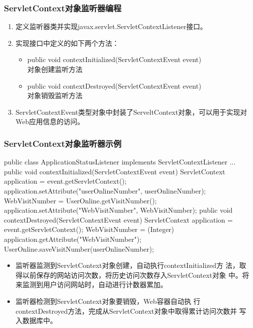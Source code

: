 \begin{frame}[fragile] %
\frametitle{ServletContext对象监听器编程} 

\begin{enumerate}\kai
\item 定义监听器类并实现javax.servlet.ServletContextListener接口。
\item 实现接口中定义的如下两个方法：
  \begin{itemize}
  \item public void contextInitialized(ServletContextEvent event) \\对象创建监听方法
  \item public void contextDestroyed(ServletContextEvent event) \\对象销毁监听方法
  \end{itemize}
\item ServletContextEvent类型对象中封装了ServeltContext对象，可以用于实现对Web应用信息的访问。
\end{enumerate}
\end{frame}

\begin{frame}[fragile] %
\frametitle{ServletContext对象监听器示例} 

\begin{javaCode}
  public class ApplicationStatusListener implements ServletContextListener {
    ...
    public void contextInitialized(ServletContextEvent event) {
      ServletContext application = event.getServletContext();
      application.setAttribute("userOnlineNumber", userOnlineNumber);
      WebVisitNumber = UserOnline.getVisitNumber();
      application.setAttribute("WebVisitNumber", WebVisitNumber);
    }
    public void contextDestroyed(ServletContextEvent event) {
      ServletContext application = event.getServletContext();
      WebVisitNumber = (Integer) application.getAttribute("WebVisitNumber");
      UserOnline.saveVisitNumber(userOnlineNumber);
    }
  }  
\end{javaCode}

\begin{itemize}\kai
\item 监听器监测到ServletContext对象创建，自动执行contextInitialized方
  法，取得以前保存的网站访问次数，将历史访问次数存入ServletContext对象
  中。将来监测到用户访问网站时，自动进行计数器累加。
\item 监听器检测到ServletContext对象要销毁，Web容器自动执
  行contextDestroyed方法，完成从ServletContext对象中取得累计访问次数并
  写入数据库中。
\end{itemize}
\end{frame}

